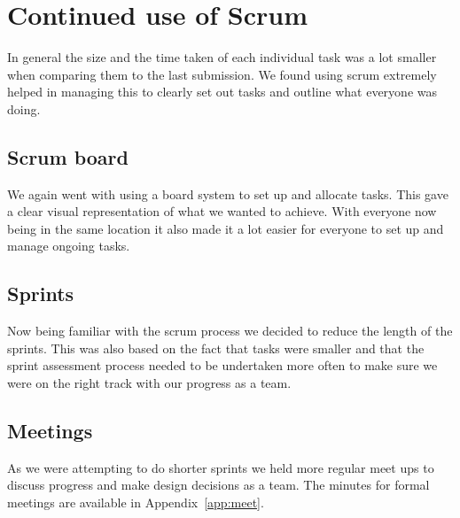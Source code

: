 \section{Continued use of Scrum}
In general the size and the time taken of each individual task was a lot smaller when comparing them to the last submission. We found using scrum extremely helped in managing this to clearly set out tasks and outline what everyone was doing.
\subsection{Scrum board}
We again went with using a board system to set up and allocate tasks. This gave a clear visual representation of what we wanted to achieve. With everyone now being in the same location it also made it a lot easier for everyone to set up and manage ongoing tasks.
\subsection{Sprints}
Now being familiar with the scrum process we decided to reduce the length of the sprints. This was also based on the fact that tasks were smaller and that the sprint assessment process needed to be undertaken more often to make sure we were on the right track with our progress as a team.
\subsection{Meetings}
As we were attempting to do shorter sprints we held more regular meet ups to discuss progress and make design decisions as a team.
The minutes for formal meetings are available in Appendix~\ref{app:meet}.
